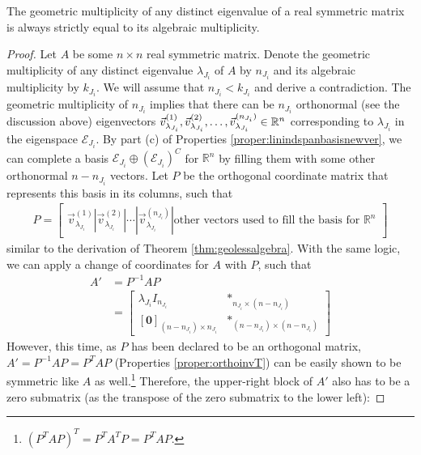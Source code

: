 \begin{proper}
\label{proper:symnodefic}
The geometric multiplicity of any distinct eigenvalue of a real symmetric matrix is always strictly equal to its algebraic multiplicity.
\end{proper}
\begin{proof}
Let $A$ be some $n \times n$ real symmetric matrix. Denote the geometric multiplicity of any distinct eigenvalue $\lambda_{J_i}$ of $A$ by $n_{J_i}$ and its algebraic multiplicity by $k_{J_i}$. We will assume that $n_{J_i} < k_{J_i}$ and derive a contradiction. The geometric multiplicity of $n_{J_i}$ implies that there can be $n_{J_i}$ orthonormal (see the discussion above) eigenvectors $\smash{\vec{v}^{(1)}_{\lambda_{J_i}}}, \smash{\vec{v}^{(2)}_{\lambda_{J_i}}}, \ldots, \smash{\vec{v}^{(n_{J_i})}_{\lambda_{J_i}}} \in \mathbb{R}^n$ corresponding to $\lambda_{J_i}$ in the eigenspace $\mathcal{E}_{J_i}$. By part (c) of Properties \ref{proper:linindspanbasisnewver}, we can complete a basis $\mathcal{E}_{J_i} \oplus (\mathcal{E}_{J_i})^C$ for $\mathbb{R}^n$ by filling them with some other orthonormal $n-n_{J_i}$ vectors. Let $P$ be the orthogonal coordinate matrix that represents this basis in its columns, such that
\begin{align*}
P = \begin{bmatrix}
\vec{v}^{(1)}_{\lambda_{J_i}} | \vec{v}^{(2)}_{\lambda_{J_i}} | \cdots | \vec{v}^{(n_{J_i})}_{\lambda_{J_i}} | \text{other vectors used to fill the basis for $\mathbb{R}^n$}
\end{bmatrix}
\end{align*}
similar to the derivation of Theorem \ref{thm:geolessalgebra}. With the same logic, we can apply a change of coordinates for $A$ with $P$, such that
\begin{align*}
A' &= P^{-1}AP \\
&= \begin{bmatrix}
\lambda_{J_i} I_{n_{J_i}} & *_{n_{J_i}\times(n-n_{J_i})} \\
[\textbf{0}]_{(n-n_{J_i})\times n_{J_i}} & *_{(n-n_{J_i})\times(n-n_{J_i})}
\end{bmatrix}
\end{align*}
However, this time, as $P$ has been declared to be an orthogonal matrix, $A' = P^{-1}AP = P^TAP$ (Properties \ref{proper:orthoinvT}) can be easily shown to be symmetric like $A$ as well.\footnote{$(P^TAP)^T = P^TA^TP = P^TAP$.} Therefore, the upper-right block of $A'$ also has to be a zero submatrix (as the transpose of the zero submatrix to the lower left):

\end{proof}
